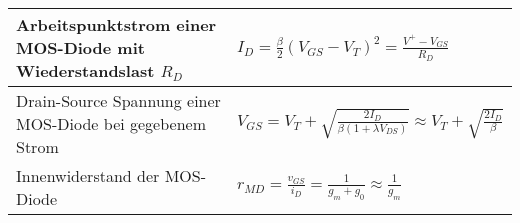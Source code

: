 \begin{tabular}{|l|l|}
	\hline
	Arbeitspunktstrom einer MOS-Diode mit Wiederstandslast $R_D$
	& $I_D = \frac{\beta}{2} (V_{GS} -V_T)^2 = \frac{V^+ - V_{GS}}{R_D} $
	\\ \hline
	Drain-Source Spannung einer MOS-Diode bei gegebenem Strom
	& $ V_{GS} = V_T + \sqrt{\frac{2I_D}{\beta(1+\lambda V_{DS})}} \approx V_T + \sqrt{\frac{2I_D}{\beta}} $
	\\ \hline
	Innenwiderstand der MOS-Diode
	& $ r_{MD} = \frac{v_{GS}}{i_D} = \frac{1}{g_m + g_0} \approx \frac{1}{g_m} $
	\\ \hline	
\end{tabular}

